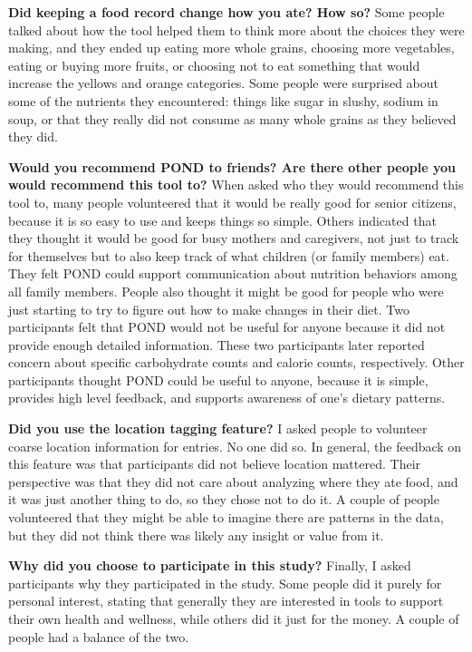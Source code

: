 \textbf{Did keeping a food record change how you ate? How so?}
Some people talked about how the tool helped them to think more about the choices they were making, and they ended up eating more whole grains, choosing more vegetables, eating or buying more fruits, or choosing not to eat something that would increase the yellows and orange categories. Some people were surprised about some of the nutrients they encountered: things like sugar in slushy, sodium in soup, or that they really did not consume as many whole grains as they believed they did. 


\textbf{Would you recommend POND to friends? Are there other people you would recommend this tool to?}
When asked who they would recommend this tool to, many people volunteered that it would be really good for senior citizens, because it is so easy to use and keeps things so simple. Others indicated that they thought it would be good for busy mothers and caregivers, not just to track for themselves but to also keep track of what children (or family members) eat. They felt POND could support communication about nutrition behaviors among all family members. People also thought it might be good for people who were just starting to try to figure out how to make changes in their diet. Two participants felt that POND would  not be useful for anyone because it did not provide enough detailed information. These two participants later reported concern about specific carbohydrate counts and calorie counts, respectively. Other participants thought POND could be useful to anyone, because it is simple, provides high level feedback,  and supports awareness of one's dietary patterns. 

\textbf{Did you use the location tagging feature? }
I asked people to volunteer coarse location information for entries. No one did so. In general, the feedback on this feature was that participants did not believe location mattered. Their perspective was that they did not care about analyzing where they ate food, and it was just another thing to do, so they chose not to do it. A couple of people volunteered that they might be able to imagine there are patterns in the data, but they did not think there was likely any insight or value from it. 

\textbf{Why did you choose to participate in this study?}
Finally, I asked participants why they participated in the study. Some people did it purely for personal interest, stating that generally they are interested in tools to support their own health and wellness, while others did it just for the money. A couple of people had a balance of the two. 


